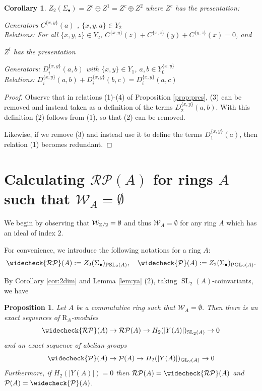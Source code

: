 \documentclass[12pt]{amsart}
\newtheorem{prop}[lem]{Proposition}
\newtheorem{cor}[lem]{Corollary}
\theoremstyle{definition}
\newcommand{\Z}{\Bbb{Z}}
\newcommand{\wn}[1]{\mathcal{W}_{#1}}%
\newcommand{\spl}[2]{\operatorname{SL}_{#1}\left(#2\right)}
\newcommand{\pspl}[2]{\mathrm{PSL}_{#1}(#2)}
\newcommand{\gl}[2]{\mathrm{GL}_{#1}(#2)}
\newcommand{\pgl}[2]{\mathrm{PGL}_{#1}(#2)}
\newcommand{\pb}[1]{\mathcal{P}(#1)}%
\newcommand{\rpb}[1]{\mathcal{RP}(#1)}%
\newcommand{\crpb}[1]{\widecheck{\mathcal{RP}}(#1)}
\newcommand{\cpb}[1]{\widecheck{\mathcal{P}}(#1)}
\newcommand{\<}{\langle}
\renewcommand{\>}{\rangle}
\newcommand{\sgr}[1]{\mathrm{R}_{#1}}%
\begin{document}
\begin{cor}\label{cor:z2pres}
$Z_2(\Sigma_\bullet)=Z^c\oplus Z^1=Z^c\oplus Z^2$  where $Z^c$ has the presentation:

Generators $C^{\{ x,y\}}(a)$ , $\{ x,y,a\}\in Y_2$\\
Relations:  For all $\{ x,y,z\}\in Y_2$, $C^{\{ x,y\}}(z)+C^{\{ x,z\}}(y)+C^{\{ y,z\}}(x)=0$, and

$Z^i$ has the presentation

Generators: $D_i^{\{ x,y\}}(a,b)$   with $\{ x,y\}\in Y_1$, $a,b\in Y^{\{ x,y\}}_0$\\
 Relations: $D_i^{\{ x,y\}}(a,b)+D_i^{\{ x,y\}}(b,c)=D_i^{\{ x,y\}}(a,c)$\\
\end{cor}
\begin{proof}
Observe that in relations (1)-(4) of Proposition \ref{prop:pres},  (3) can be removed and instead taken as a definition of the terms  $D_2^{\{ x,y\}}(a,b)$. With this definition (2) follows from (1), so that (2) can be removed.

 Likewise, if we remove (3) and instead use it to define  the terms  $D_1^{\{ x,y\}}(a)$, then relation (1) becomes redundant.
\end{proof}














\section{Calculating $\rpb{A}$ for rings $A$ such that $\wn{A}=\emptyset$}\label{sec:wna=0}

We begin by observing that $\wn{\Z/2}=\emptyset$ and thus $\wn{A}=\emptyset$ for any ring $A$ which has an ideal of index $2$.

For convenience, we introduce the following notations for a ring $A$:
\[
\crpb{A}:= Z_2(\Sigma_\bullet)_{\pspl{2}{A}},\quad \cpb{A}:= Z_2(\Sigma_\bullet)_{\pgl{2}{A}}.
\]

By 
Corollary \ref{cor:2dim} and Lemma \ref{lem:ya} (2), taking $\spl{2}{A}$-coinvariants, we have 
\begin{prop}\label{prop:exacta} Let $A$ be a commutative ring such that $\wn{A}=\emptyset$.  Then there is an  exact sequences of $\sgr{A}$-modules
\[
\crpb{A}
\to \rpb{A}\to H_2(|Y(A)|)_{\spl{2}{A}}\to 0
\]
and an exact sequence of abelian groups
\[
\cpb{A} \to \pb{A}\to H_2(|Y(A)|)_{\gl{2}{A}}\to 0
\]
Furthermore, if $H_2(|Y(A)|)=0$  then $\rpb{A}=\crpb{A}$ and $\pb{A}=\cpb{A}$.
\end{prop}
\end{document}

